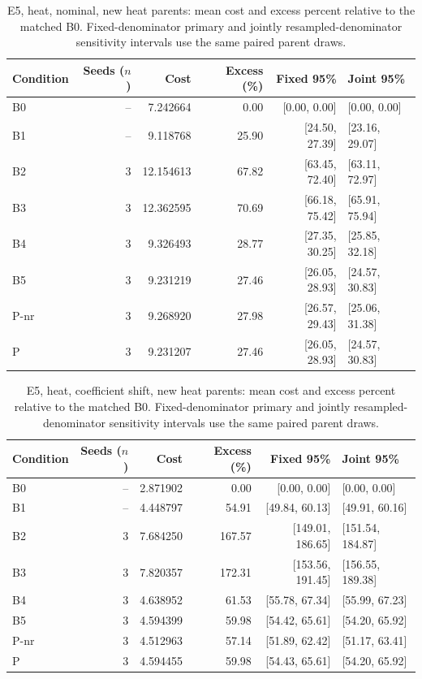 \begin{table}[ht]
\centering\small
\caption{E5, heat, nominal, new heat parents: mean cost and excess percent relative to the matched B0. Fixed-denominator primary and jointly resampled-denominator sensitivity intervals use the same paired parent draws.}\label{tab:revision_cost_E5_heat_locked_nominal}
\begin{tabular}{@{}lrrrrl@{}}\toprule
Condition & Seeds ($n$) & Cost & Excess (\%) & Fixed 95\% & Joint 95\%\\\midrule
B0 & -- & 7.242664 & 0.00 & [0.00, 0.00] & [0.00, 0.00]\\
B1 & -- & 9.118768 & 25.90 & [24.50, 27.39] & [23.16, 29.07]\\
B2 & 3 & 12.154613 & 67.82 & [63.45, 72.40] & [63.11, 72.97]\\
B3 & 3 & 12.362595 & 70.69 & [66.18, 75.42] & [65.91, 75.94]\\
B4 & 3 & 9.326493 & 28.77 & [27.35, 30.25] & [25.85, 32.18]\\
B5 & 3 & 9.231219 & 27.46 & [26.05, 28.93] & [24.57, 30.83]\\
P-nr & 3 & 9.268920 & 27.98 & [26.57, 29.43] & [25.06, 31.38]\\
P & 3 & 9.231207 & 27.46 & [26.05, 28.93] & [24.57, 30.83]\\
\bottomrule\end{tabular}
\end{table}

\begin{table}[ht]
\centering\small
\caption{E5, heat, coefficient shift, new heat parents: mean cost and excess percent relative to the matched B0. Fixed-denominator primary and jointly resampled-denominator sensitivity intervals use the same paired parent draws.}\label{tab:revision_cost_E5_heat_locked_coefficient_ood}
\begin{tabular}{@{}lrrrrl@{}}\toprule
Condition & Seeds ($n$) & Cost & Excess (\%) & Fixed 95\% & Joint 95\%\\\midrule
B0 & -- & 2.871902 & 0.00 & [0.00, 0.00] & [0.00, 0.00]\\
B1 & -- & 4.448797 & 54.91 & [49.84, 60.13] & [49.91, 60.16]\\
B2 & 3 & 7.684250 & 167.57 & [149.01, 186.65] & [151.54, 184.87]\\
B3 & 3 & 7.820357 & 172.31 & [153.56, 191.45] & [156.55, 189.38]\\
B4 & 3 & 4.638952 & 61.53 & [55.78, 67.34] & [55.99, 67.23]\\
B5 & 3 & 4.594399 & 59.98 & [54.42, 65.61] & [54.20, 65.92]\\
P-nr & 3 & 4.512963 & 57.14 & [51.89, 62.42] & [51.17, 63.41]\\
P & 3 & 4.594455 & 59.98 & [54.43, 65.61] & [54.20, 65.92]\\
\bottomrule\end{tabular}
\end{table}

